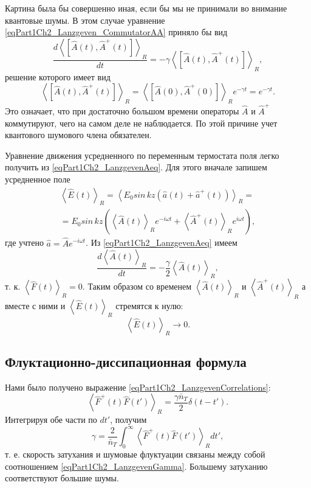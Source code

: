 Картина была бы совершенно иная, если бы мы не принимали во внимание
квантовые шумы. В этом случае уравнение
\eqref{eqPart1Ch2_Lanzgeven_CommutatorAA} приняло бы вид
\begin{equation}
\frac{d \left<\left[\hat{A}\left(t\right),\hat{A}^{+}\left(t\right)\right]\right>_R}{d
t}=
- \gamma \left<\left[\hat{A}\left(t\right),\hat{A}^{+}\left(t\right)\right]\right>_R,
\nonumber
\end{equation}
решение которого имеет вид
\begin{equation}
\left<\left[\hat{A}\left(t\right),\hat{A}^{+}\left(t\right)\right]\right>_R
= 
\left<\left[\hat{A}\left(0\right),\hat{A}^{+}\left(0\right)\right]\right>_R
e^{- \gamma t}= e^{- \gamma t}.
\nonumber
\end{equation}
Это означает, что при достаточно большом времени операторы $\hat{A}$ и
$\hat{A}^{+}$ коммутируют, чего на самом деле не наблюдается. По этой
причине учет квантового шумового члена обязателен.


Уравнение движения усредненного по переменным термостата поля легко
получить из \eqref{eqPart1Ch2_LanzgevenAeq}. Для этого вначале запишем
усредненное поле
\begin{eqnarray}
\left<\hat{E}\left(t\right)\right>_R 
= \left< E_0 sin\,kz \left( \hat{a}\left(t\right) +
\hat{a}^{+}\left(t\right)\right)\right>_R  = 
\nonumber \\
= E_0 sin\,kz
\left(\left<\hat{A}\left(t\right)\right>_R e^{-i \omega t}
+
\left<\hat{A}^{+}\left(t\right)\right>_R e^{i \omega t}
\right),
\nonumber
\end{eqnarray}
где учтено $\hat{a} = \hat{A}e^{-i \omega t}$. Из
\eqref{eqPart1Ch2_LanzgevenAeq} имеем 
\begin{equation}
\frac{d \left<\hat{A}\left(t\right)\right>_R}{d t} = 
- \frac{\gamma}{2} \left<\hat{A}\left(t\right)\right>_R,
\nonumber
\end{equation}
т. к. $\left<\hat{F}\left(t\right)\right>_R = 0$. Таким образом со
временем $\left<\hat{A}\left(t\right)\right>_R$ и
$\left<\hat{A}^{+}\left(t\right)\right>_R$ а вместе с ними и  
$\left<\hat{E}\left(t\right)\right>_R$ стремятся к нулю:
\begin{equation}
\left<\hat{E}\left(t\right)\right>_R \rightarrow 0.
\nonumber
\end{equation}

\subsection{Флуктационно-диссипационная формула}
Нами было получено выражение \eqref{eqPart1Ch2_LanzgevenCorrelations}:
\begin{equation}
\left<\hat{F}^{+}\left(t\right)\hat{F}\left(t'\right)\right>_R = 
\frac{\gamma \bar{n}_{T}}{2} \delta\left(t - t'\right).
\nonumber
\end{equation}
Интегрируя обе части по $d t'$, получим
\begin{equation}
\gamma =
\frac{2}{\bar{n}_T}\int_0^{\infty}\left<\hat{F}^{+}\left(t\right)\hat{F}\left(t'\right)\right>_R
d t',
\label{eqPart1Ch2_LanzgevenGamma}
\end{equation}
т. е. скорость затухания и шумовые флуктуации связаны между собой
соотношением \eqref{eqPart1Ch2_LanzgevenGamma}. Большему затуханию
соответствуют большие шумы.
